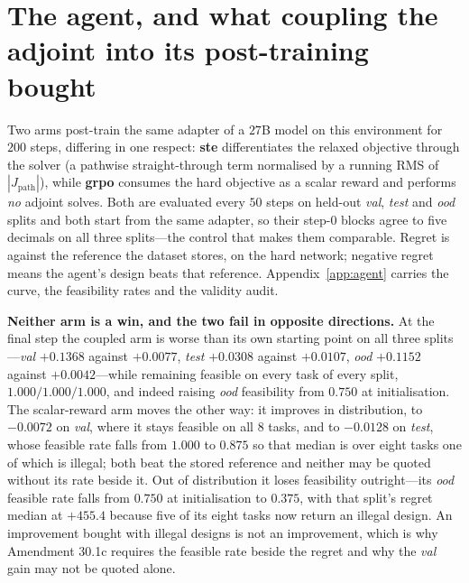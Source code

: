 \documentclass{article}
\newcommand{\Jpath}{J_{\mathrm{path}}}
\begin{document}
\section{The agent, and what coupling the adjoint into its post-training bought}
\label{sec:agent}

Two arms post-train the same adapter of a $27$B model on this environment for $200$ steps,
differing in one respect: \textbf{ste} differentiates the relaxed objective through the solver (a
pathwise straight-through term normalised by a running RMS of $|\Jpath|$), while \textbf{grpo}
consumes the hard objective as a scalar reward and performs \emph{no} adjoint solves.  Both are
evaluated every $50$ steps on held-out \emph{val}, \emph{test} and \emph{ood} splits and both start
from the same adapter, so their step-$0$ blocks agree to five decimals on all three splits---the
control that makes them comparable.  Regret is against the reference the dataset stores, on the
hard network; negative regret means the agent's design beats that reference.
Appendix~\ref{app:agent} carries the curve, the feasibility rates and the validity audit.

\textbf{Neither arm is a win, and the two fail in opposite directions.}  At the final step the
coupled arm is worse than its own starting point on all three splits---\emph{val} $+0.1368$
against $+0.0077$, \emph{test} $+0.0308$ against $+0.0107$, \emph{ood} $+0.1152$
against $+0.0042$---while remaining feasible on every task of every split, $1.000/1.000/1.000$, and
indeed raising \emph{ood} feasibility from $0.750$ at initialisation.  The scalar-reward arm
moves the other way: it improves in distribution, to $-0.0072$ on \emph{val}, where it
stays feasible on all $8$ tasks, and to $-0.0128$ on \emph{test}, whose feasible rate falls from
$1.000$ to $0.875$ so that median is over eight tasks one of which is illegal; both beat the
stored reference and neither may be quoted without its rate beside it.  Out of distribution it
loses feasibility outright---its \emph{ood} feasible rate falls from $0.750$ at initialisation to
$0.375$, with that split's regret median at $+455.4$ because five of its eight tasks now
return an illegal design.  An improvement bought with illegal designs is not an improvement,
which is why Amendment 30.1c requires the feasible rate beside the regret and why the \emph{val}
gain may not be quoted alone.
\end{document}
